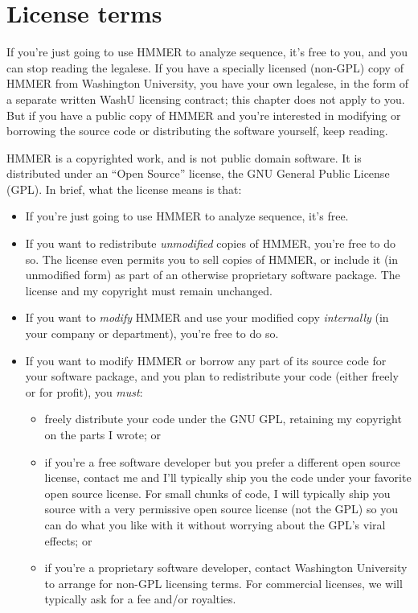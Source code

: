 \chapter{License terms}

If you're just going to use HMMER to analyze sequence, it's free to
you, and you can stop reading the legalese. If you have a specially
licensed (non-GPL) copy of HMMER from Washington University, you have
your own legalese, in the form of a separate written WashU licensing
contract; this chapter does not apply to you. But if you have a public
copy of HMMER and you're interested in modifying or borrowing the
source code or distributing the software yourself, keep reading.

HMMER is a copyrighted work, and is not public domain software.  It is
distributed under an ``Open Source'' license, the GNU General Public
License (GPL). In brief, what the license means is that:

\begin{itemize}
\item If you're just going to use HMMER to analyze sequence, it's free.

\item If you want to redistribute {\em unmodified} copies of
HMMER, you're free to do so.  The license even permits you to sell
copies of HMMER, or include it (in unmodified form) as part of an
otherwise proprietary software package. The license and my copyright
must remain unchanged.

\item If you want to {\em modify} HMMER and use your modified
copy {\em internally} (in your company or department), you're free to
do so.

\item If you want to modify HMMER or borrow any part of its source code
for your software package, and you plan to redistribute your code
(either freely or for profit), you {\em must}:
\begin{itemize}
\item freely distribute your code under the GNU GPL, retaining
my copyright on the parts I wrote; or
\item if you're a free software developer but you prefer a
different open source license, contact me and I'll typically ship you
the code under your favorite open source license. For small chunks
of code, I will typically ship you source with
a very permissive open source license (not the GPL)
so you can do what you like with it without worrying about
the GPL's viral effects; or
\item if you're a proprietary software developer, 
contact Washington University to arrange for non-GPL licensing
terms. For commercial licenses, we will typically ask for a fee
and/or royalties.
\end{itemize}
\end{itemize}

